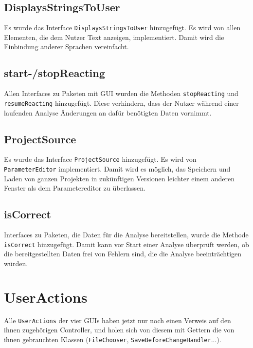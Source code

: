 \documentclass[a4paper]{scrreprt}
\begin{document}
\subsection{DisplaysStringsToUser}
Es wurde das Interface \verb!DisplaysStringsToUser! hinzugefügt. Es wird von allen Elementen, die dem Nutzer Text anzeigen, implementiert. Damit wird die Einbindung anderer Sprachen vereinfacht. \\

\subsection{start-/stopReacting}
Allen Interfaces zu Paketen mit GUI wurden die Methoden \verb!stopReacting! und \\ \verb!resumeReacting! hinzugefügt. Diese verhindern, dass der Nutzer während einer laufenden Analyse Änderungen an dafür benötigten Daten vornimmt. \\

\subsection{ProjectSource}
Es wurde das Interface \verb!ProjectSource! hinzugefügt. Es wird von \verb!ParameterEditor! implementiert. Damit wird es möglich, das Speichern und Laden von ganzen Projekten in zukünftigen Versionen leichter einem anderen Fenster als dem Parametereditor zu überlassen. \\
\subsection{isCorrect}
Interfaces zu Paketen, die Daten für die Analyse bereitstellen, wurde die Methode \verb!isCorrect! hinzugefügt. Damit kann vor Start einer Analyse überprüft werden, ob die bereitgestellten Daten frei von Fehlern sind, die die Analyse beeinträchtigen würden.

\section{UserActions}
Alle \verb!UserActions! der vier GUIs haben jetzt nur noch einen Verweis auf den ihnen zugehörigen Controller, und holen sich von diesem mit Gettern die von ihnen gebrauchten Klassen (\verb!FileChooser!, \verb!SaveBeforeChangeHandler!...).
\end{document}
